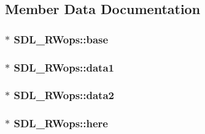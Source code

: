 \subsection{Member Data Documentation}
\subsubsection[{\texorpdfstring{base}{base}}]{$\ast$ S\+D\+L\+\_\+\+R\+Wops\+::base}\hypertarget{struct_s_d_l___r_wops_af9b489d7342296ce197b911cfa93b2ab}{}\label{struct_s_d_l___r_wops_af9b489d7342296ce197b911cfa93b2ab}
\subsubsection[{\texorpdfstring{data1}{data1}}]{$\ast$ S\+D\+L\+\_\+\+R\+Wops\+::data1}\hypertarget{struct_s_d_l___r_wops_ab89d27b4312c0b9d664c81bc92917fc8}{}\label{struct_s_d_l___r_wops_ab89d27b4312c0b9d664c81bc92917fc8}
\subsubsection[{\texorpdfstring{data2}{data2}}]{$\ast$ S\+D\+L\+\_\+\+R\+Wops\+::data2}\hypertarget{struct_s_d_l___r_wops_aca073130e2e262eb11e86e1be993e215}{}\label{struct_s_d_l___r_wops_aca073130e2e262eb11e86e1be993e215}
\subsubsection[{\texorpdfstring{here}{here}}]{$\ast$ S\+D\+L\+\_\+\+R\+Wops\+::here}\hypertarget{struct_s_d_l___r_wops_a6fc84601c17e347c6ef24c63a79deb57}{}\label{struct_s_d_l___r_wops_a6fc84601c17e347c6ef24c63a79deb57}

